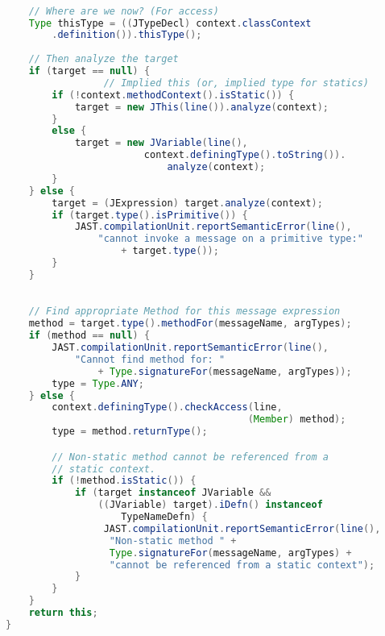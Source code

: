 \documentclass[8pt,a4paper,compress]{beamer}
\begin{document}
\begin{frame}[fragile]
\pause

\begin{lstlisting}[language=Java,style=focusin]

    // Where are we now? (For access)
    Type thisType = ((JTypeDecl) context.classContext
        .definition()).thisType();
        
    // Then analyze the target
    if (target == null) {
                 // Implied this (or, implied type for statics)
        if (!context.methodContext().isStatic()) {
            target = new JThis(line()).analyze(context);
        }
        else {
            target = new JVariable(line(),
                        context.definingType().toString()).
                            analyze(context);
        }
    } else {
        target = (JExpression) target.analyze(context);
        if (target.type().isPrimitive()) {
            JAST.compilationUnit.reportSemanticError(line(),
                "cannot invoke a message on a primitive type:"
                    + target.type());
        }
    }
\end{lstlisting}
\end{frame}

\begin{frame}[fragile]
\pause

\begin{lstlisting}[language=Java,style=focusin]

    // Find appropriate Method for this message expression
    method = target.type().methodFor(messageName, argTypes);
    if (method == null) {
        JAST.compilationUnit.reportSemanticError(line(),
            "Cannot find method for: "
                + Type.signatureFor(messageName, argTypes));
        type = Type.ANY;
    } else {
        context.definingType().checkAccess(line,
                                          (Member) method);
        type = method.returnType();

        // Non-static method cannot be referenced from a
        // static context.
        if (!method.isStatic()) {
            if (target instanceof JVariable &&
                ((JVariable) target).iDefn() instanceof
                    TypeNameDefn) {
                 JAST.compilationUnit.reportSemanticError(line(),
                  "Non-static method " +
                  Type.signatureFor(messageName, argTypes) +
                  "cannot be referenced from a static context");
            }
        }
    }
    return this;
}
\end{lstlisting}
\end{frame}
\end{document}
